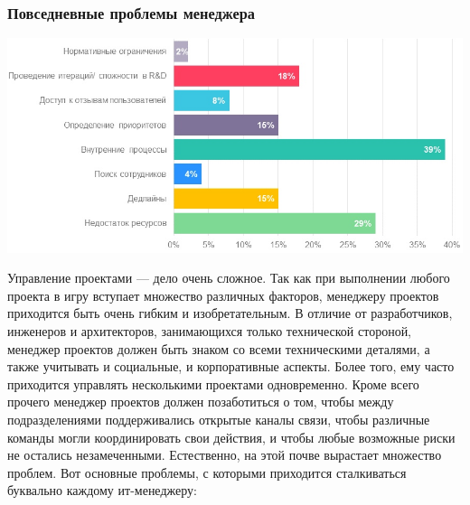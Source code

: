 \documentclass{../industrial-development}
\begin{document}
\begin{frame} \frametitle{Повседневные проблемы менеджера}
{\includegraphics[width=1\linewidth]{problem.png}}
\end{frame}
\lecturenotes
Управление проектами — дело очень сложное. Так как при выполнении любого проекта в игру вступает множество различных факторов, менеджеру проектов приходится быть очень гибким и изобретательным. В отличие от разработчиков, инженеров и архитекторов, занимающихся только технической стороной, менеджер проектов должен быть знаком со всеми техническими деталями, а также учитывать и социальные, и корпоративные аспекты. Более того, ему часто приходится управлять несколькими проектами одновременно. Кроме всего прочего менеджер проектов должен позаботиться о том, чтобы между подразделениями поддерживались открытые каналы связи, чтобы различные команды могли координировать свои действия, и чтобы любые возможные риски не остались незамеченными. Естественно, на этой почве вырастает множество проблем. Вот основные проблемы, с которыми приходится сталкиваться буквально каждому ит-менеджеру: 
\end{document}
